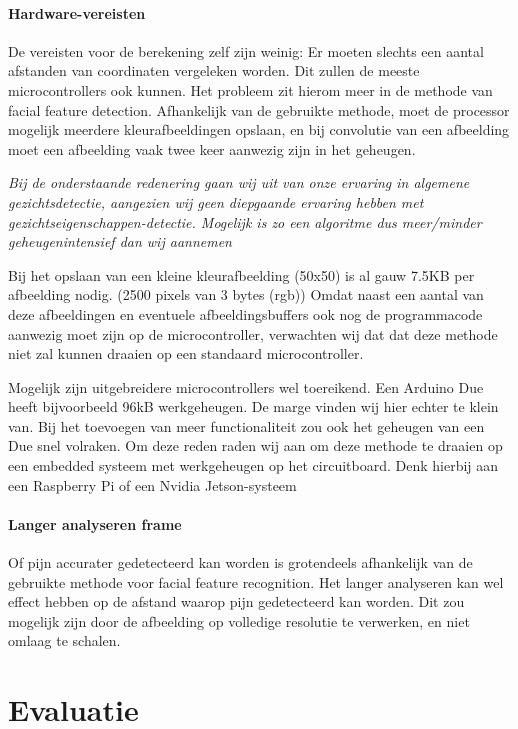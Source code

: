 \documentclass[11pt]{article}
\begin{document}
    \paragraph{Hardware-vereisten}
    De vereisten voor de berekening zelf zijn weinig: Er moeten slechts een aantal afstanden van coordinaten vergeleken worden.
    Dit zullen de meeste microcontrollers ook kunnen.
    Het probleem zit hierom meer in de methode van facial feature detection.
    Afhankelijk van de gebruikte methode, moet de processor mogelijk meerdere kleurafbeeldingen opslaan, en bij convolutie van een afbeelding moet een afbeelding vaak twee keer aanwezig zijn in het geheugen.
    
    \emph{Bij de onderstaande redenering gaan wij uit van onze ervaring in algemene gezichtsdetectie, aangezien wij geen diepgaande ervaring hebben met gezichtseigenschappen-detectie.
    Mogelijk is zo een algoritme dus meer/minder geheugenintensief dan wij aannemen}

    Bij het opslaan van een kleine kleurafbeelding (50x50) is al gauw 7.5KB per afbeelding nodig. (2500 pixels van 3 bytes (rgb))
    Omdat naast een aantal van deze afbeeldingen en eventuele afbeeldingsbuffers ook nog de programmacode aanwezig moet zijn op de microcontroller,
    verwachten wij dat dat deze methode niet zal kunnen draaien op een standaard microcontroller.

    
    Mogelijk zijn uitgebreidere microcontrollers wel toereikend.
    Een Arduino Due heeft bijvoorbeeld 96kB werkgeheugen.
    De marge vinden wij hier echter te klein van.
    Bij het toevoegen van meer functionaliteit zou ook het geheugen van een Due snel volraken.
    Om deze reden raden wij aan om deze methode te draaien op een embedded systeem met werkgeheugen op het circuitboard.
    Denk hierbij aan een Raspberry Pi of een Nvidia Jetson-systeem

    \paragraph{Langer analyseren frame}
    Of pijn accurater gedetecteerd kan worden is grotendeels afhankelijk van de gebruikte methode voor facial feature recognition.
    Het langer analyseren kan wel effect hebben op de afstand waarop pijn gedetecteerd kan worden.
    Dit zou mogelijk zijn door de afbeelding op volledige resolutie te verwerken, en niet omlaag te schalen.




    \section{Evaluatie}\label{sec:evaluatie}
\end{document}
